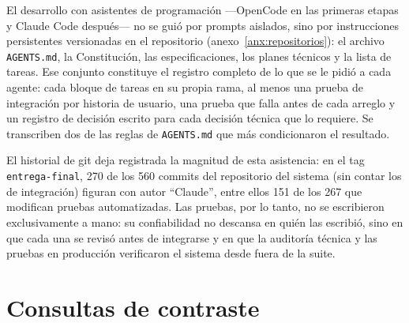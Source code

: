 El desarrollo con asistentes de programación ---OpenCode en las primeras
etapas y Claude Code después--- no se guió por prompts aislados, sino por
instrucciones persistentes versionadas en el repositorio
(anexo~\ref{anx:repositorios}): el archivo \texttt{AGENTS.md}, la
Constitución, las especificaciones, los planes técnicos y la lista de
tareas. Ese conjunto constituye el registro completo de lo que se le
pidió a cada agente: cada bloque de tareas en su propia rama, al menos
una prueba de integración por historia de usuario, una prueba que falla
antes de cada arreglo y un registro de decisión escrito para cada
decisión técnica que lo requiere. Se transcriben dos de las reglas de
\texttt{AGENTS.md} que más condicionaron el resultado.



El historial de git deja registrada la magnitud de esta asistencia: en
el tag \texttt{entrega-final}, 270 de los 560 commits del repositorio
del sistema (sin contar los de integración) figuran con autor
``Claude'', entre ellos 151 de los 267 que modifican pruebas
automatizadas. Las pruebas, por lo tanto,
no se escribieron exclusivamente a mano: su confiabilidad no descansa en
quién las escribió, sino en que cada una se revisó antes de integrarse y
en que la auditoría técnica y las pruebas en producción verificaron el
sistema desde fuera de la suite.

\section{Consultas de contraste}

